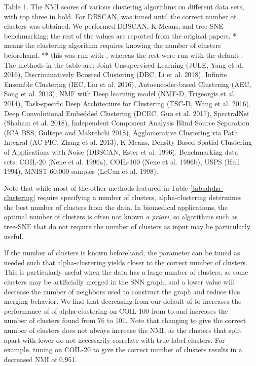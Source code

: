 \documentclass{article}
\begin{document}
\begin{table}[H]
  \caption*{Table 1. The NMI scores of various clustering algorithms on different data sets, with top three in bold. For DBSCAN,  was tuned until the correct number of clusters was obtained. We performed DBSCAN, K-Means, and tree-SNE benchmarking; the rest of the values are reported from the original papers. * means the clustering algorithm requires knowing the number of clusters beforehand. ** this was run with , whereas the rest were run with the default . The methods in the table are: Joint Unsupervised Learning (JULE, Yang et al. 2016), Discriminatively Boosted Clustering (DBC, Li et al. 2018), Infinite Ensemble Clustering (IEC, Liu et al. 2016), Autoencoder-based Clustering (AEC, Song et al. 2013), NMF with Deep learning model (NMF-D, Trigeorgis et al. 2014), Task-specific Deep Architecture for Clustering (TSC-D, Wang et al. 2016), Deep Convolutional Embedded Clustering (DCEC, Guo et al. 2017), SpectralNet (Shaham et al. 2018), Independent Component Analysis Blind Source Separation (ICA BSS, Gultepe and Makrehchi 2018), Agglomerative Clustering via Path Integral (AC-PIC, Zhang et al. 2013), K-Means, Density-Based Spatial Clustering of Applications with Noise (DBSCAN, Ester et al. 1996). Benchmarking data sets: COIL-20 (Nene et al. 1996a), COIL-100 (Nene et al. 1996b), USPS (Hull 1994), MNIST 60,000 samples (LeCun et al. 1998).}
  \label{tab:alpha-clustering}
\end{table}

Note that while most of the other methods featured in Table \ref{tab:alpha-clustering} require specifying a number of clusters, alpha-clustering determines the best number of clusters from the data.
In biomedical applications, the optimal number of clusters is often not known {\em a priori}, so algorithms such as tree-SNE that do not require the number of clusters as input may be particularly useful.

If the number of clusters is known beforehand, the  parameter can be tuned as needed such that alpha-clustering yields closer to the correct number of clusters. This is particularly useful when the data has a large number of clusters, as some clusters may be artificially merged in the SNN graph, and a lower  value will decrease the number of neighbors used to construct the graph and reduce this merging behavior. We find that decreasing  from our default of  to  increases the performance of of alpha-clustering on COIL-100 from  to  and increases the number of clusters found from 76 to 101. Note that changing  to give the correct number of clusters does not always increase the NMI, as the clusters that split apart with lower  do not necessarily correlate with true label clusters. For example, tuning  on COIL-20 to give the correct number of clusters results in a decreased NMI of 0.951.
\end{document}
